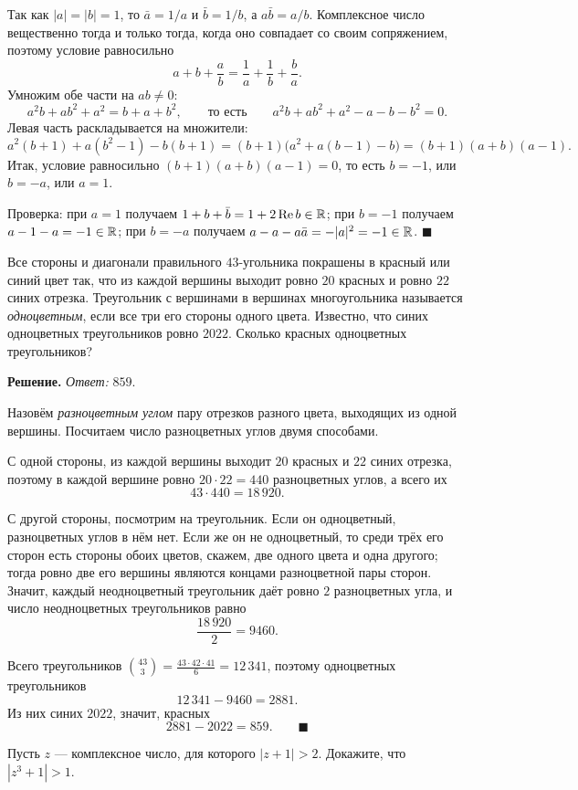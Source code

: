 Так как $|a|=|b|=1$, то $\bar a=1/a$ и $\bar b=1/b$, а $a\bar b=a/b$. Комплексное число вещественно тогда и только тогда, когда оно совпадает со своим сопряжением, поэтому условие равносильно
\[
a+b+\frac ab=\frac1a+\frac1b+\frac ba .
\]
Умножим обе части на $ab\ne 0$:
\[
a^2b+ab^2+a^2=b+a+b^2,
\qquad\text{то есть}\qquad
a^2b+ab^2+a^2-a-b-b^2=0 .
\]
Левая часть раскладывается на множители:
\[
a^2(b+1)+a(b^2-1)-b(b+1)=(b+1)\bigl(a^2+a(b-1)-b\bigr)=(b+1)(a+b)(a-1).
\]
Итак, условие равносильно $(b+1)(a+b)(a-1)=0$, то есть $b=-1$, или $b=-a$, или $a=1$.

Проверка: при $a=1$ получаем $1+b+\bar b=1+2\operatorname{Re}b\in\mathbb{R}$; при $b=-1$ получаем $a-1-a=-1\in\mathbb{R}$; при $b=-a$ получаем $a-a-a\bar a=-|a|^2=-1\in\mathbb{R}$. \hfill$\blacksquare$
\fi

\q Все стороны и диагонали правильного $43$-угольника покрашены в красный или синий цвет так, что из каждой вершины выходит ровно $20$ красных и ровно $22$ синих отрезка. Треугольник с вершинами в вершинах многоугольника называется \emph{одноцветным}, если все три его стороны одного цвета. Известно, что синих одноцветных треугольников ровно $2022$. Сколько красных одноцветных треугольников?

\if{}
\textbf{Решение.} \emph{Ответ:} $859$.

Назовём \emph{разноцветным углом} пару отрезков разного цвета, выходящих из одной вершины. Посчитаем число разноцветных углов двумя способами.

С одной стороны, из каждой вершины выходит $20$ красных и $22$ синих отрезка, поэтому в каждой вершине ровно $20\cdot 22=440$ разноцветных углов, а всего их
\[
43\cdot 440=18\,920 .
\]

С другой стороны, посмотрим на треугольник. Если он одноцветный, разноцветных углов в нём нет. Если же он не одноцветный, то среди трёх его сторон есть стороны обоих цветов, скажем, две одного цвета и одна другого; тогда ровно две его вершины являются концами разноцветной пары сторон. Значит, каждый неодноцветный треугольник даёт ровно $2$ разноцветных угла, и число неодноцветных треугольников равно
\[
\frac{18\,920}{2}=9460 .
\]

Всего треугольников $\binom{43}{3}=\frac{43\cdot 42\cdot 41}{6}=12\,341$, поэтому одноцветных треугольников
\[
12\,341-9460=2881 .
\]
Из них синих $2022$, значит, красных
\[
2881-2022=859 . \qquad \blacksquare
\]
\fi

\q Пусть $z$ --- комплексное число, для которого $|z+1|>2$. Докажите, что $|z^3+1|>1$.

